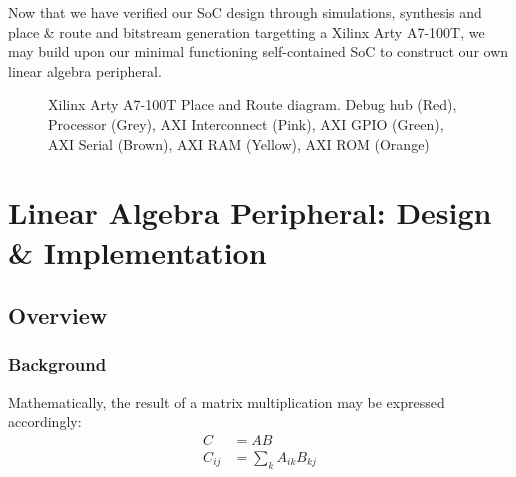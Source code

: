 \documentclass[a4paper,8pt]{report}
\begin{document}
Now that we have verified our SoC design through simulations, synthesis and place
\& route and bitstream generation targetting a Xilinx Arty A7-100T, we may build
upon our minimal functioning self-contained SoC to construct our own linear
algebra peripheral.
\begin{figure}[h]
  \centering
  \caption{Xilinx Arty A7-100T Place and Route diagram. Debug hub (Red), Processor (Grey), AXI Interconnect (Pink), AXI GPIO (Green), AXI Serial
    (Brown), AXI RAM (Yellow), AXI ROM (Orange)}
  \label{fig:soc_pr}
\end{figure}

\chapter{Linear Algebra Peripheral: Design \& Implementation}
\section{Overview}
\subsection{Background}
Mathematically, the result of a matrix multiplication may be expressed
accordingly:
\begin{align*}
  C &= AB \\
  C_{ij} &= \sum_k A_{ik}B_{kj}
\end{align*}
\end{document}
